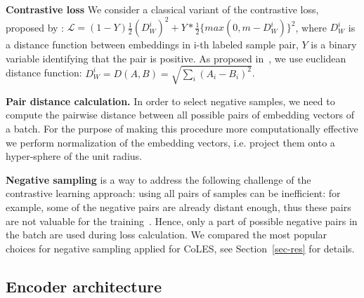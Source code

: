 \documentclass[sigconf, anonymous]{acmart}
\begin{document}
\textbf{Contrastive loss} We consider a classical variant of the contrastive loss, proposed by \citep{Hadsell2006DimensionalityRB}: %
$ \mathcal{L} =  (1-Y)\frac{1}{2}(D_W^i)^2 +Y*\frac{1}{2}\{max(0,m-D_W^i)\}^2 $, where $D_W^i$ is a distance function between embeddings in i-th labeled sample pair, $Y$ is a binary variable identifying that the pair is positive.  As proposed in~\citep{Hadsell2006DimensionalityRB}, we use euclidean distance function: $D_W^i = D(A,B) = \sqrt{\sum_i(A_i - B_i)^2}$.


\textbf{Pair distance calculation.} In order to select negative samples, we need to compute the pairwise distance between all possible pairs of embedding vectors of a batch. For the purpose of making this procedure more computationally effective we perform normalization of the embedding vectors, i.e. project them onto a hyper-sphere of the unit radius. 

\textbf{Negative sampling} is a way to address the following challenge of the contrastive learning approach: using all pairs of samples can be inefficient: for example, some of the negative pairs are already distant enough, thus these pairs are not valuable for the training~\citep{SimoSerra2015DiscriminativeLO, Schroff2015FaceNetAU}. Hence, only a part of possible negative pairs in the batch are used during loss calculation. We compared the most popular choices for negative sampling applied for CoLES, see Section~\ref{sec-res} for details.

\subsection{Encoder architecture} \label{sec-enc-arch}
\end{document}
